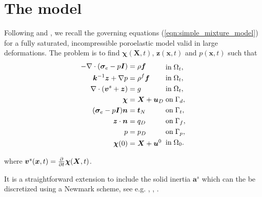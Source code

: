 \section{The model}
\label{sec:large_model}
Following \cite{ateshian2010finite} and \cite{almeida1998finite}, we recall the governing equations (\ref{eqn:simple_mixture_model}) for a fully saturated, incompressible poroelastic model  valid in large deformations. The problem is to find $\boldsymbol{\chi}(\boldsymbol{X},t)$,  $\boldsymbol{z}(\boldsymbol{x},t)$ and $p(\boldsymbol{x},t)$ such that
\begin{equation}
\label{eqn:mixture_momentum_reform}
\begin{gathered}\begin{aligned}
-\nabla \cdot( \boldsymbol{\sigma}_{e} -p\boldsymbol{I}) &= \rho\boldsymbol{f} \\
{\boldsymbol{k}^{-1}\boldsymbol{z}} + \nabla p &=  \rho^{f}\boldsymbol{f}  \\
\nabla \cdot (\boldsymbol{v}^{s} + \boldsymbol{z} )  &= g  \\
\boldsymbol{\chi} &= \boldsymbol{X}+\boldsymbol{u}_{D}  \\
(\boldsymbol{\sigma}_{e}-p\boldsymbol{I})\boldsymbol{n} &= \boldsymbol{t}_{N}  \\
\boldsymbol{z} \cdot \boldsymbol{n} &= {q_{D}}  \\
p &= p_{D}  \\
\boldsymbol{\chi}(0) &= \boldsymbol{X} + \boldsymbol{u}^{0}
\end{aligned}\end{gathered}
\;
\begin{gathered}\begin{aligned}
&\mbox{in} \; \Omega_{t}, \\
&\mbox{in} \; \Omega_{t}, \\
&\mbox{in} \; \Omega_{t}, \\
&\mbox{on} \; \Gamma_{d}, \\
&\mbox{on} \; \Gamma_{t}, \\
&\mbox{on} \; \Gamma_{f}, \\
&\mbox{on} \; \Gamma_{p}, \\
&\mbox{in} \; \Omega_{0}.
\end{aligned}\end{gathered}
\end{equation}

where $\boldsymbol{v}^{s}(\boldsymbol{x},t)=  \frac{\partial }{\partial t}\boldsymbol{\chi}(\boldsymbol{X},t)$.
\begin{rem}
It is a  straightforward extension to include the solid inertia $\boldsymbol{a}^{s}$ which can the be discretized using a Newmark scheme, see e.g. \cite{chapelle2010poroelastic}, \cite{li2004dynamics}, \cite{sauter2010robust}.
\end{rem}
